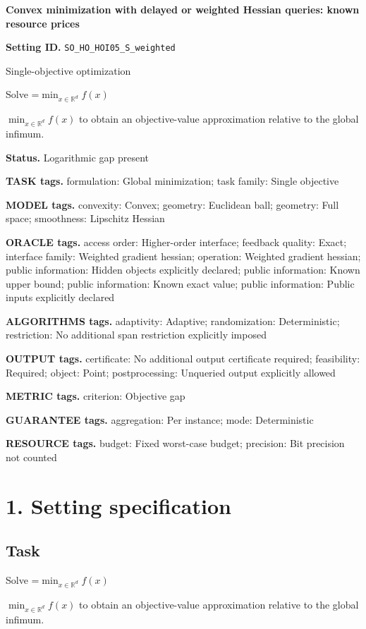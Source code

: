 \documentclass[10pt,a4paper]{article}
\newcommand{\AtlasMath}[1]{\par\begingroup\centering\setbox0=\hbox{$\displaystyle #1$}\ifdim\wd0>1.4\linewidth\typeout{ATLAS WIDE FORMULA: \the\wd0}\fi\ifdim\wd0>\linewidth\resizebox{\linewidth}{!}{\box0}\else\box0\fi\par\endgroup}
\newcommand{\AtlasInlineMath}[1]{\begingroup\setbox0=\hbox{$#1$}\ifdim\wd0>.4\linewidth\endgroup\AtlasMath{#1}\else\endgroup$#1$\fi}
\begin{document}
\raggedright

{\LARGE\bfseries\sffamily\color{AtlasNavy} Convex minimization with delayed or weighted Hessian queries: known resource prices\par}\vspace{5pt}
\textbf{Setting ID.} \texttt{SO\_\allowbreak{}HO\_\allowbreak{}HOI05\_\allowbreak{}S\_\allowbreak{}weighted}

Single-objective optimization

Solve \AtlasInlineMath{\min_{x\in \mathbb{R}^d}f(x)} to obtain an objective-value approximation relative to the global infimum.

\textbf{Status.} Logarithmic gap present

\textbf{TASK tags.} formulation: Global minimization; task family: Single objective

\textbf{MODEL tags.} convexity: Convex; geometry: Euclidean ball; geometry: Full space; smoothness: Lipschitz Hessian

\textbf{ORACLE tags.} access order: Higher-order interface; feedback quality: Exact; interface family: Weighted gradient hessian; operation: Weighted gradient hessian; public information: Hidden objects explicitly declared; public information: Known upper bound; public information: Known exact value; public information: Public inputs explicitly declared

\textbf{ALGORITHMS tags.} adaptivity: Adaptive; randomization: Deterministic; restriction: No additional span restriction explicitly imposed

\textbf{OUTPUT tags.} certificate: No additional output certificate required; feasibility: Required; object: Point; postprocessing: Unqueried output explicitly allowed

\textbf{METRIC tags.} criterion: Objective gap

\textbf{GUARANTEE tags.} aggregation: Per instance; mode: Deterministic

\textbf{RESOURCE tags.} budget: Fixed worst-case budget; precision: Bit precision not counted

\section{1. Setting specification}
\subsection{Task}
Solve \AtlasInlineMath{\min_{x\in \mathbb{R}^d}f(x)} to obtain an objective-value approximation relative to the global infimum.
\end{document}
